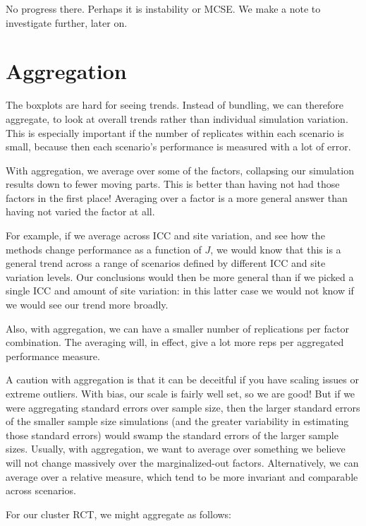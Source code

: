 \documentclass[
]{book}
\begin{document}
No progress there. Perhaps it is instability or MCSE.
We make a note to investigate further, later on.

\hypertarget{aggregation}{%
\section{Aggregation}\label{aggregation}}

The boxplots are hard for seeing trends.
Instead of bundling, we can therefore aggregate, to look at overall trends rather than individual simulation variation.
This is especially important if the number of replicates within each scenario is small, because then each scenario's performance is measured with a lot of error.

With aggregation, we average over some of the factors, collapsing our simulation results down to fewer moving parts.
This is better than having not had those factors in the first place!
Averaging over a factor is a more general answer than having not varied the factor at all.

For example, if we average across ICC and site variation, and see how the methods change performance as a function of \(J\), we would know that this is a general trend across a range of scenarios defined by different ICC and site variation levels.
Our conclusions would then be more general than if we picked a single ICC and amount of site variation: in this latter case we would not know if we would see our trend more broadly.

Also, with aggregation, we can have a smaller number of replications per factor combination.
The averaging will, in effect, give a lot more reps per aggregated performance measure.

A caution with aggregation is that it can be deceitful if you have scaling issues or extreme outliers.
With bias, our scale is fairly well set, so we are good!
But if we were aggregating standard errors over sample size, then the larger standard errors of the smaller sample size simulations (and the greater variability in estimating those standard errors) would swamp the standard errors of the larger sample sizes.
Usually, with aggregation, we want to average over something we believe will not change massively over the marginalized-out factors.
Alternatively, we can average over a relative measure, which tend to be more invariant and comparable across scenarios.

For our cluster RCT, we might aggregate as follows:
\end{document}
